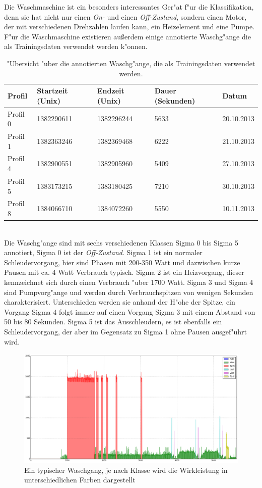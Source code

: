 Die Waschmaschine ist ein besonders interessantes Ger"at f"ur die Klassifikation, denn sie hat nicht nur einen \textit{On-} und einen \textit{Off-Zustand}, sondern einen Motor, der mit verschiedenen Drehzahlen laufen kann, ein Heizelement und eine Pumpe. F"ur die Waschmaschine existieren au{\ss}erdem einige annotierte Waschg"ange die als Trainingsdaten verwendet werden k"onnen.\\
\begin{table}[h]
\begin{tabular}{l|l|l|l|l}
Profil & Startzeit (Unix) & Endzeit (Unix) & Dauer (Sekunden) & Datum \\
\hline
Profil 0 & 1382290611 & 1382296244 & 5633 & 20.10.2013 \\
Profil 1 & 1382363246 & 1382369468 & 6222 & 21.10.2013 \\
Profil 4 & 1382900551 & 1382905960 & 5409 & 27.10.2013 \\
Profil 5 & 1383173215 & 1383180425 & 7210 & 30.10.2013 \\
Profil 8 & 1384066710 & 1384072260 & 5550 & 10.11.2013
\end{tabular}
\caption["Ubersicht Trainingsdaten]{"Ubersicht "uber die annotierten Waschg"ange, die als Trainingsdaten verwendet werden.}
\label{profile01458}
\end{table}\\
Die Waschg"ange sind mit sechs verschiedenen Klassen Sigma 0 bis Sigma 5 annotiert, Sigma 0 ist der \textit{Off-Zustand}. Sigma 1 ist ein normaler Schleudervorgang, hier sind Phasen mit 200-350 Watt und dazwischen kurze Pausen mit ca. 4 Watt Verbrauch typisch.
Sigma 2 ist ein Heizvorgang, dieser kennzeichnet sich durch einen Verbrauch "uber 1700 Watt.
Sigma 3 und Sigma 4 sind Pumpvorg"ange und werden durch Verbrauchspitzen von wenigen Sekunden charakterisiert. Unterschieden werden sie anhand der H"ohe der Spitze, ein Vorgang Sigma 4 folgt immer auf einen Vorgang Sigma 3 mit einem Abstand von 50 bis 80 Sekunden.
Sigma 5 ist das Ausschleudern, es ist ebenfalls ein Schleudervorgang, der aber im Gegensatz zu Sigma 1 ohne Pausen ausgef"uhrt wird.
\begin{figure}[ht]
\includegraphics[height=0.8\textwidth , angle=90]{1_Grafiken/classes0.png}
	\caption[Typischer Waschgang, farbig annotiert]{Ein typischer Waschgang, je nach Klasse wird die Wirkleistung in unterschiedlichen Farben dargestellt}
\label{typWasch}
\end{figure}
